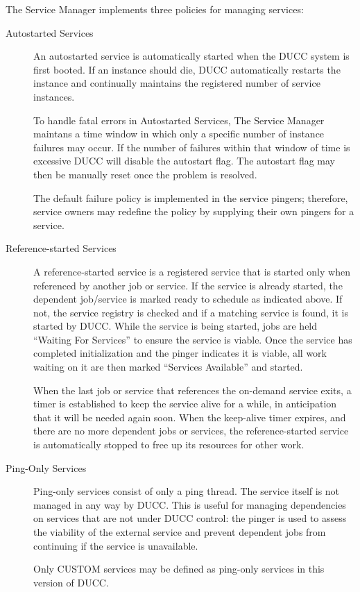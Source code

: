       The Service Manager implements three policies for managing services:
      \begin{description}

         \item[Autostarted Services] An autostarted service is automatically started when the DUCC
           system is first booted.  If an instance should die, DUCC automatically restarts the
           instance and continually maintains the registered number of service instances.

           To handle fatal errors in Autostarted Services, The Service Manager maintans a time
           window in which only a specific number of instance failures may occur.  If the number of
           failures within that window of time is excessive DUCC will disable the autostart flag.
           The autostart flag may then be manually reset once the problem is resolved.

           The default failure policy is implemented in the service pingers; therefore, service
           owners may redefine the policy by supplying their own pingers for a service.
          
         \item[Reference-started Services] A reference-started service is a registered service that
           is started only when referenced by another job or service. If the service is already
           started, the dependent job/service is marked ready to schedule as indicated above. If
           not, the service registry is checked and if a matching service is found, it is 
           started by DUCC.  While the service is being started, jobs are held ``Waiting For Services''
           to ensure the service is viable. Once the service has completed initialization and the pinger 
           indicates it is viable, all work waiting on it are then marked ``Services Available'' and
           started.  
          
           When the last job or service that references the on-demand service exits, a timer is
           established to keep the service alive for a while, in anticipation that it will be needed
           again soon.  When the keep-alive timer expires, and there are no more dependent jobs or
           services, the reference-started service is automatically stopped to free up its resources
           for other work.

        \item[Ping-Only Services] 
          \label{subsub:services.ping-only}
          Ping-only services consist of only
          a ping thread.  The service itself is not managed in any way by DUCC.  This is useful for
          managing dependencies on services that are not under DUCC control: the pinger is used
          to assess the viability of the external service and prevent dependent jobs from
          continuing if the service is unavailable.

          Only CUSTOM services may be defined as ping-only services in this version of DUCC.

      \end{description}


